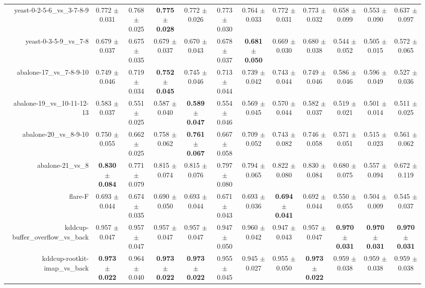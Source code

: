 \begin{table}[!ht]
{\begin{tabular}{r c c c c c c c c c c c}
yeast-0-2-5-6\_vs\_3-7-8-9 & 0.772 $\pm$ 0.031 & 0.768 $\pm$ 0.025 & \textbf{0.775 $\pm$ 0.028} & 0.772 $\pm$ 0.026 & 0.773 $\pm$ 0.030 & 0.764 $\pm$ 0.033 & 0.772 $\pm$ 0.031 & 0.773 $\pm$ 0.032 & 0.658 $\pm$ 0.099 & 0.553 $\pm$ 0.090 & 0.637 $\pm$ 0.097 \\
yeast-0-3-5-9\_vs\_7-8 & 0.679 $\pm$ 0.037 & 0.675 $\pm$ 0.035 & 0.679 $\pm$ 0.037 & 0.670 $\pm$ 0.043 & 0.678 $\pm$ 0.037 & \textbf{0.681 $\pm$ 0.050} & 0.669 $\pm$ 0.030 & 0.680 $\pm$ 0.038 & 0.544 $\pm$ 0.052 & 0.505 $\pm$ 0.015 & 0.572 $\pm$ 0.065 \\
abalone-17\_vs\_7-8-9-10 & 0.749 $\pm$ 0.046 & 0.719 $\pm$ 0.034 & \textbf{0.752 $\pm$ 0.045} & 0.745 $\pm$ 0.046 & 0.713 $\pm$ 0.044 & 0.739 $\pm$ 0.042 & 0.743 $\pm$ 0.044 & 0.749 $\pm$ 0.046 & 0.586 $\pm$ 0.046 & 0.596 $\pm$ 0.049 & 0.527 $\pm$ 0.036 \\
abalone-19\_vs\_10-11-12-13 & 0.583 $\pm$ 0.037 & 0.551 $\pm$ 0.025 & 0.587 $\pm$ 0.040 & \textbf{0.589 $\pm$ 0.047} & 0.554 $\pm$ 0.046 & 0.569 $\pm$ 0.045 & 0.570 $\pm$ 0.044 & 0.582 $\pm$ 0.037 & 0.519 $\pm$ 0.021 & 0.501 $\pm$ 0.014 & 0.511 $\pm$ 0.025 \\
abalone-20\_vs\_8-9-10 & 0.750 $\pm$ 0.055 & 0.662 $\pm$ 0.025 & 0.758 $\pm$ 0.062 & \textbf{0.761 $\pm$ 0.067} & 0.667 $\pm$ 0.058 & 0.709 $\pm$ 0.052 & 0.743 $\pm$ 0.082 & 0.746 $\pm$ 0.058 & 0.571 $\pm$ 0.051 & 0.515 $\pm$ 0.023 & 0.561 $\pm$ 0.062 \\
abalone-21\_vs\_8 & \textbf{0.830 $\pm$ 0.084} & 0.771 $\pm$ 0.079 & 0.815 $\pm$ 0.074 & 0.815 $\pm$ 0.076 & 0.797 $\pm$ 0.080 & 0.794 $\pm$ 0.065 & 0.822 $\pm$ 0.080 & 0.830 $\pm$ 0.084 & 0.680 $\pm$ 0.075 & 0.557 $\pm$ 0.094 & 0.672 $\pm$ 0.119 \\
flare-F & 0.693 $\pm$ 0.044 & 0.674 $\pm$ 0.035 & 0.690 $\pm$ 0.050 & 0.693 $\pm$ 0.044 & 0.671 $\pm$ 0.043 & 0.693 $\pm$ 0.036 & \textbf{0.694 $\pm$ 0.041} & 0.692 $\pm$ 0.044 & 0.550 $\pm$ 0.055 & 0.504 $\pm$ 0.009 & 0.545 $\pm$ 0.037 \\
kddcup-buffer\_overflow\_vs\_back & 0.957 $\pm$ 0.047 & 0.957 $\pm$ 0.047 & 0.957 $\pm$ 0.047 & 0.957 $\pm$ 0.047 & 0.947 $\pm$ 0.050 & 0.960 $\pm$ 0.042 & 0.947 $\pm$ 0.043 & 0.957 $\pm$ 0.047 & \textbf{0.970 $\pm$ 0.031} & \textbf{0.970 $\pm$ 0.031} & \textbf{0.970 $\pm$ 0.031} \\
kddcup-rootkit-imap\_vs\_back & \textbf{0.973 $\pm$ 0.022} & 0.964 $\pm$ 0.040 & \textbf{0.973 $\pm$ 0.022} & \textbf{0.973 $\pm$ 0.022} & 0.955 $\pm$ 0.045 & 0.945 $\pm$ 0.027 & 0.955 $\pm$ 0.050 & \textbf{0.973 $\pm$ 0.022} & 0.959 $\pm$ 0.038 & 0.959 $\pm$ 0.038 & 0.959 $\pm$ 0.038 \\

\end{tabular}}
\end{table}
